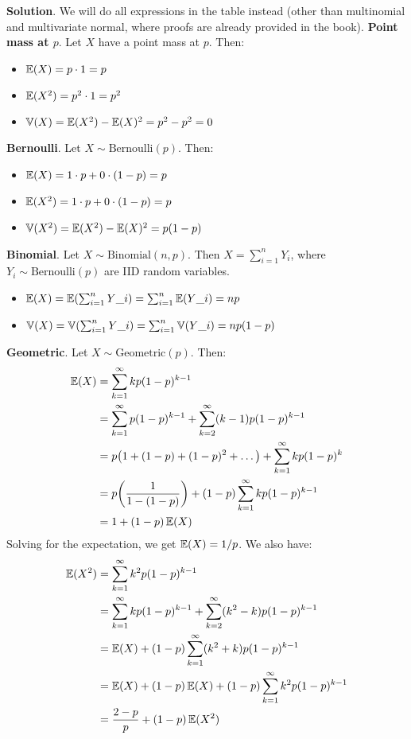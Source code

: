 \textbf{Solution}.
We will do all expressions in the table instead (other than multinomial
and multivariate normal, where proofs are already provided in the book).
\textbf{Point mass at \(p\)}. Let \(X\) have a point mass at \(p\).
Then:
\begin{itemize}[tightlist]
\item
  \(\operatorname{\mathbb{E}}(X) = p \cdot 1 = p\)
\item
  \(\operatorname{\mathbb{E}}(X^{2}) = p^{2} \cdot 1 = p^{2}\)
\item
  \(\operatorname{\mathbb{V}}(X) = \operatorname{\mathbb{E}}(X^{2}) - \operatorname{\mathbb{E}}(X)^{2} = p^{2} - p^{2} = 0\)
\end{itemize}
\textbf{Bernoulli}. Let \(X \sim \text{Bernoulli}(p)\). Then:
\begin{itemize}[tightlist]
\item
  \(\operatorname{\mathbb{E}}(X) = 1 \cdot p + 0 \cdot (1 - p) = p \)
\item
  \(\operatorname{\mathbb{E}}(X^{2}) = 1 \cdot p + 0 \cdot (1 - p) = p\)
\item
  \(\operatorname{\mathbb{V}}(X^{2}) = \operatorname{\mathbb{E}}(X^{2}) - \operatorname{\mathbb{E}}(X)^{2} = p(1 - p)\)
\end{itemize}
\textbf{Binomial}. Let \(X \sim \text{Binomial}(n, p)\). Then
\(X = \sum_{i=1}^{n} Y_{i}\), where \(Y_{i} \sim \text{Bernoulli}(p)\) are IID
random variables.
\begin{itemize}[tightlist]
\item
  \(\EXP(X) = \EXP\left( \sum_{i=1}^{n} Y\_{i} \right)
  = \sum_{i=1}^{n} \EXP(Y\_{i}) = np\)
\item
  \(\VAR(X) = \VAR\left(\sum_{i=1}^{n} Y\_{i} \right)
  = \sum_{i=1}^{n} \VAR(Y\_{i}) = np(1-p)\)
\end{itemize}
\textbf{Geometric}. Let \(X \sim \text{Geometric}(p)\). Then:
\begin{align*}
\EXP(X) &= \sum_{k=1}^{\infty} k p (1 - p)^{k - 1}  \\
&= \sum_{k=1}^{\infty} p(1-p)^{k-1} + \sum_{k=2}^{\infty} (k - 1) p(1-p)^{k - 1} \\
&= p \left( 1 + (1 - p) + (1 - p)^{2} + \dots \right) + \sum_{k=1}^{\infty} k p(1-p)^{k} \\
&= p \left(\frac{1}{1 - (1 - p)}\right) + (1 - p) \sum_{k=1}^{\infty} k p(1-p)^{k - 1} \\
&= 1 + (1 - p) \EXP(X)
\end{align*}
Solving for the expectation, we get \(\operatorname{\mathbb{E}}(X) = 1/p\).
We also have:
\begin{align*}
\operatorname{\mathbb{E}}(X^{2}) &= \sum_{k=1}^{\infty} k^{2} p (1 - p)^{k - 1}  \\
&= \sum_{k=1}^{\infty} k p(1-p)^{k-1} + \sum_{k=2}^{\infty} (k^{2} - k) p(1-p)^{k - 1} \\
&= \operatorname{\mathbb{E}}(X) + (1 - p) \sum_{k=1}^{\infty} (k^{2} + k) p(1-p)^{k - 1} \\
&= \operatorname{\mathbb{E}}(X) + (1 - p) \operatorname{\mathbb{E}}(X) + (1 - p) \sum_{k=1}^{\infty} k^{2} p(1-p)^{k-1} \\
&= \frac{2 - p}{p} + (1 - p) \operatorname{\mathbb{E}}(X^{2})
\end{align*}
